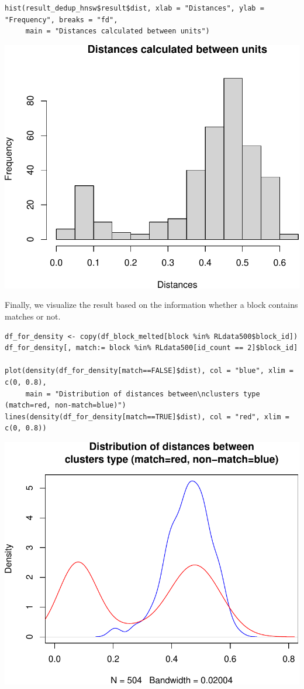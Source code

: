 \begin{verbatim}
hist(result_dedup_hnsw$result$dist, xlab = "Distances", ylab = "Frequency", breaks = "fd",
     main = "Distances calculated between units")
\end{verbatim}

\includegraphics[width=1\linewidth]{paper-blocking_files/figure-latex/dedup_hist-1}

Finally, we visualize the result based on the information whether a block contains matches or not.

\begin{verbatim}
df_for_density <- copy(df_block_melted[block %in% RLdata500$block_id])
df_for_density[, match:= block %in% RLdata500[id_count == 2]$block_id]

plot(density(df_for_density[match==FALSE]$dist), col = "blue", xlim = c(0, 0.8), 
     main = "Distribution of distances between\nclusters type (match=red, non-match=blue)")
lines(density(df_for_density[match==TRUE]$dist), col = "red", xlim = c(0, 0.8))
\end{verbatim}

\includegraphics[width=1\linewidth]{paper-blocking_files/figure-latex/dedup_density-1}

